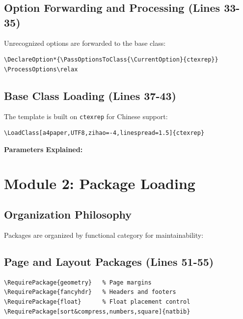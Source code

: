 \documentclass[linux]{hustreport}
\begin{document}
\subsection{Option Forwarding and Processing (Lines 33-35)}

Unrecognized options are forwarded to the base class:

\begin{verbatim}
\DeclareOption*{\PassOptionsToClass{\CurrentOption}{ctexrep}}
\ProcessOptions\relax
\end{verbatim}

\subsection{Base Class Loading (Lines 37-43)}

The template is built on \texttt{ctexrep} for Chinese support:

\begin{verbatim}
\LoadClass[a4paper,UTF8,zihao=-4,linespread=1.5]{ctexrep}
\end{verbatim}

\textbf{Parameters Explained:}
\begin{optionlist}
\end{optionlist}

\newpage
\section{Module 2: Package Loading}

\subsection{Organization Philosophy}

Packages are organized by functional category for maintainability:

\subsection{Page and Layout Packages (Lines 51-55)}

\begin{verbatim}
\RequirePackage{geometry}   % Page margins
\RequirePackage{fancyhdr}   % Headers and footers
\RequirePackage{float}      % Float placement control
\RequirePackage[sort&compress,numbers,square]{natbib}
\end{verbatim}
\end{document}
